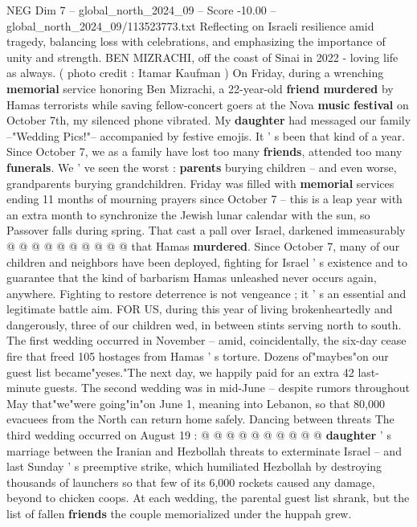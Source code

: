 \begin{textsample}{NEG Dim 7 – global\_north\_2024\_09 – Score -10.00 – global\_north\_2024\_09/113523773.txt}  \label{ex:f7_neg_017}
Reflecting on Israeli resilience amid tragedy, balancing loss with celebrations, and emphasizing the importance of unity and strength.
BEN MIZRACHI, off the coast of Sinai in 2022 - loving life as always. ( photo credit : Itamar Kaufman ) On Friday, during a wrenching \textbf{memorial} service honoring Ben Mizrachi, a 22-year-old \textbf{friend} \textbf{murdered} by Hamas terrorists while saving fellow-concert goers at the Nova \textbf{music} \textbf{festival} on October 7th, my silenced phone vibrated.
My \textbf{daughter} had messaged our family --"Wedding Pics!"-- accompanied by festive emojis.
It ' s been that kind of a year.
Since October 7, we as a family have lost too many \textbf{friends}, attended too many \textbf{funerals}.
We ' ve seen the worst : \textbf{parents} burying children -- and even worse, grandparents burying grandchildren.
Friday was filled with \textbf{memorial} services ending 11 months of mourning prayers since October 7 -- this is a leap year with an extra month to synchronize the Jewish lunar calendar with the sun, so Passover falls during spring.
That cast a pall over Israel, darkened immeasurably @ @ @ @ @ @ @ @ @ @ that Hamas \textbf{murdered}.
Since October 7, many of our children and neighbors have been deployed, fighting for Israel ' s existence and to guarantee that the kind of barbarism Hamas unleashed never occurs again, anywhere.
Fighting to restore deterrence is not vengeance ; it ' s an essential and legitimate battle aim.
FOR US, during this year of living brokenheartedly and dangerously, three of our children wed, in between stints serving north to south.
The first wedding occurred in November -- amid, coincidentally, the six-day cease fire that freed 105 hostages from Hamas ' s torture.
Dozens of"maybes"on our guest list became"yeses."The next day, we happily paid for an extra 42 last-minute guests.
The second wedding was in mid-June -- despite rumors throughout May that"we"were going"in"on June 1, meaning into Lebanon, so that 80,000 evacuees from the North can return home safely.
Dancing between threats The third wedding occurred on August 19 : @ @ @ @ @ @ @ @ @ @ \textbf{daughter} ' s marriage between the Iranian and Hezbollah threats to exterminate Israel -- and last Sunday ' s preemptive strike, which humiliated Hezbollah by destroying thousands of launchers so that few of its 6,000 rockets caused any damage, beyond to chicken coops.
At each wedding, the parental guest list shrank, but the list of fallen \textbf{friends} the couple memorialized under the huppah grew.

\end{textsample}
